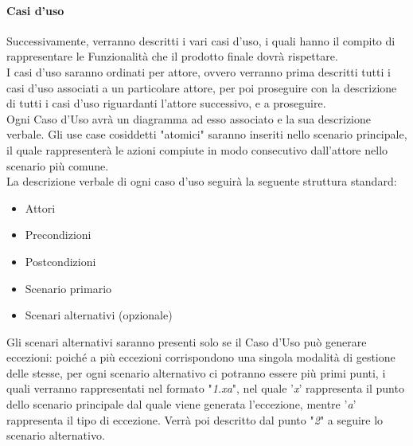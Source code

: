 \paragraph{Casi d'uso}
Successivamente, verranno descritti i vari casi d'uso, i quali hanno il compito di rappresentare le Funzionalità che il prodotto finale dovrà rispettare. \\
I casi d'uso saranno ordinati per attore, ovvero verranno prima descritti tutti i casi d'uso associati a un particolare attore, per poi proseguire con la descrizione di tutti i casi d'uso riguardanti l'attore successivo, e a proseguire. \\
Ogni Caso d'Uso avrà un diagramma ad esso associato e la sua descrizione verbale. Gli use case cosiddetti "atomici" saranno inseriti nello scenario principale, il quale rappresenterà le azioni compiute in modo consecutivo dall'attore nello scenario più comune. \\
La descrizione verbale di ogni caso d'uso seguirà la seguente struttura standard:
\begin{itemize}
    \item Attori
    \item Precondizioni
    \item Postcondizioni
    \item Scenario primario
    \item Scenari alternativi (opzionale)
\end{itemize}
\begin{comment}
I sottocasi d'uso non verranno descritti individualmente, poiché sarà già tutto descritto a livello atomico nello Scenario principale del relativo Caso d'Uso "padre".
\end{comment}
Gli scenari alternativi saranno presenti solo se il Caso d'Uso può generare eccezioni: poiché a più eccezioni corrispondono una singola modalità di gestione delle stesse, per ogni scenario alternativo ci potranno essere più primi punti, i quali verranno rappresentati nel formato "\textit{1.xa}", nel quale '\textit{x}' rappresenta il punto dello scenario principale dal quale viene generata l'eccezione, mentre '\textit{a}' rappresenta il tipo di eccezione. Verrà poi descritto dal punto "\textit{2}" a seguire lo scenario alternativo.
